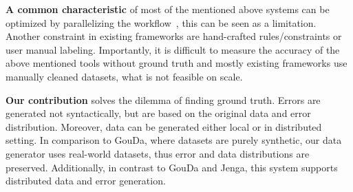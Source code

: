 
\textbf{A common characteristic} of most of the mentioned above systems can be optimized by parallelizing the workflow~\cite{raha, baran, RekatsinasCIR2017, holodetect, RestatGCS2022, jenga}, this can be seen as a limitation.
Another constraint in existing frameworks are hand-crafted rules/constraints or user manual labeling.
Importantly, it is difficult to measure the accuracy of the above mentioned tools without ground truth and mostly existing frameworks use manually cleaned datasets, what is not feasible on scale.

\textbf{Our contribution} solves the dilemma of finding ground truth.
Errors are generated not syntactically, but are based on the original data and error distribution.
Moreover, data can be generated either local or in distributed setting.
In comparison to GouDa, where datasets are purely synthetic, our data generator uses real-world datasets,
thus error and data distributions are preserved. 
Additionally, in contrast to GouDa and Jenga, this system supports distributed data and error generation.

